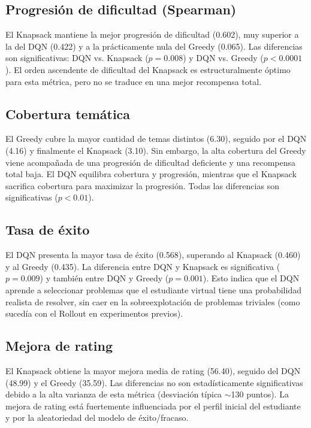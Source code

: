 \documentclass[12pt, a4paper]{article}
\begin{document}
\subsection{Progresión de dificultad (Spearman)}

El Knapsack mantiene la mejor progresión de dificultad (0.602), muy superior
a la del DQN (0.422) y a la prácticamente nula del Greedy (0.065). Las
diferencias son significativas: DQN vs. Knapsack ($p = 0.008$) y DQN vs.
Greedy ($p < 0.0001$). El orden ascendente de dificultad del Knapsack es
estructuralmente óptimo para esta métrica, pero no se traduce en una mejor
recompensa total.

\subsection{Cobertura temática}

El Greedy cubre la mayor cantidad de temas distintos (6.30), seguido por el
DQN (4.16) y finalmente el Knapsack (3.10). Sin embargo, la alta cobertura
del Greedy viene acompañada de una progresión de dificultad deficiente y
una recompensa total baja. El DQN equilibra cobertura y progresión, mientras
que el Knapsack sacrifica cobertura para maximizar la progresión. Todas las
diferencias son significativas ($p < 0.01$).

\subsection{Tasa de éxito}

El DQN presenta la mayor tasa de éxito (0.568), superando al Knapsack (0.460)
y al Greedy (0.435). La diferencia entre DQN y Knapsack es significativa
($p = 0.009$) y también entre DQN y Greedy ($p = 0.001$). Esto indica que el
DQN aprende a seleccionar problemas que el estudiante virtual tiene una
probabilidad realista de resolver, sin caer en la sobreexplotación de
problemas triviales (como sucedía con el Rollout en experimentos previos).

\subsection{Mejora de rating}

El Knapsack obtiene la mayor mejora media de rating (56.40), seguido del DQN
(48.99) y el Greedy (35.59). Las diferencias no son estadísticamente
significativas debido a la alta varianza de esta métrica (desviación típica
$\sim$130 puntos). La mejora de rating está fuertemente influenciada por el
perfil inicial del estudiante y por la aleatoriedad del modelo de éxito/fracaso.
\end{document}
